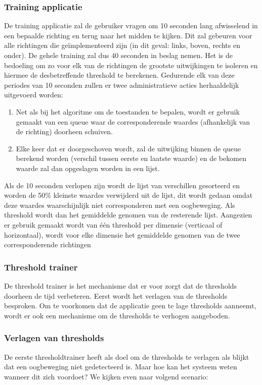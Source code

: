 \documentclass{article}
\begin{document}
\subsubsection{Training applicatie}
\label{sec:training}
De training applicatie zal de gebruiker vragen om 10 seconden lang afwisselend in een bepaalde richting  en terug naar het midden te kijken. Dit zal gebeuren voor alle richtingen die geïmplementeerd zijn (in dit geval: links, boven, rechts en onder).
De gehele training zal dus 40 seconden in beslag nemen. Het is de bedoeling om zo voor elk van de richtingen de grootste uitwijkingen te isoleren en hiermee de desbetreffende threshold te berekenen. Gedurende elk van deze periodes van 10 seconden zullen er twee administratieve acties herhaaldelijk uitgevoerd worden:
\begin{enumerate}
	\item Net als bij het algoritme om de toestanden te bepalen, wordt er gebruik gemaakt van een queue waar de corresponderende waardes (afhankelijk van de richting) doorheen schuiven.
	\item Elke keer dat er doorgeschoven wordt, zal de uitwijking binnen de queue berekend worden (verschil tussen eerste en laatste waarde) en de bekomen waarde zal dan opgeslagen worden in een lijst.
\end{enumerate}
Als de 10 seconden verlopen zijn wordt de lijst van verschillen gesorteerd en worden de 50\% kleinste waardes verwijderd uit de lijst, dit wordt gedaan omdat deze waardes waarschijnlijk niet corresponderen met een oogbeweging. Als threshold wordt dan het gemiddelde genomen van de resterende lijst. Aangezien er gebruik gemaakt wordt van \'e\'en threshold per dimensie (verticaal of horizontaal), wordt voor elke dimensie het gemiddelde genomen van de twee corresponderende richtingen 

\subsubsection{Threshold trainer}
\label{sec:trainer}
De threshold trainer is het mechanisme dat er voor zorgt dat de thresholds doorheen de tijd verbeteren. Eerst wordt het verlagen van de thresholds besproken. Om te voorkomen dat de applicatie geen te lage thresholds aanneemt, wordt er ook een mechanisme om de thresholds te verhogen aangeboden.
\subsubsection*{Verlagen van thresholds}
De eerste thresholdtrainer heeft als doel om de thresholds te verlagen als blijkt dat een oogbeweging niet gedetecteerd is. Maar hoe kan het systeem weten wanneer dit zich voordoet? We kijken even naar volgend scenario:
\end{document}
